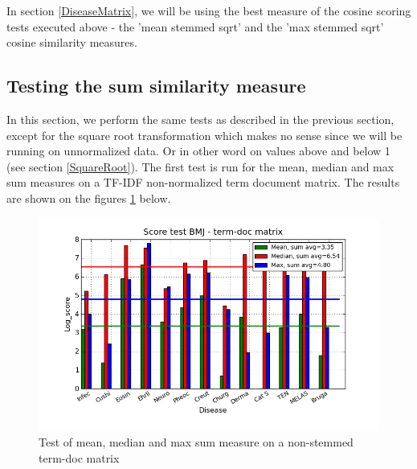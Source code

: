 In section \ref{DiseaseMatrix}, we will be using the best measure of the cosine scoring tests 
executed above - the 'mean stemmed sqrt' and the 'max stemmed sqrt' cosine similarity measures.

\subsection{Testing the sum similarity measure\label{TestingSumSimilarity}}

In this section, we perform the same tests as described in the
previous section, except for the square root transformation which
makes no sense since we will be running on unnormalized data. Or in
other word on values above and below 1 (see section
\ref{SquareRoot}). The first test is run for the mean, median and max
sum measures on a TF-IDF non-normalized term document matrix. The
results are shown on the figures
\ref{termDoc_bmj_hist_3000_sum_mea_med_max} below.

\begin{figure}[H]
  \caption{Test of mean, median and max sum measure on a non-stemmed term-doc matrix}
  \begin{center}
    \includegraphics[width=1.2\textwidth]{barcharts/termDoc_bmj_hist_3000_sum_mea_med_max.png}
  \end{center}
  \label{termDoc_bmj_hist_3000_sum_mea_med_max}
\end{figure}

